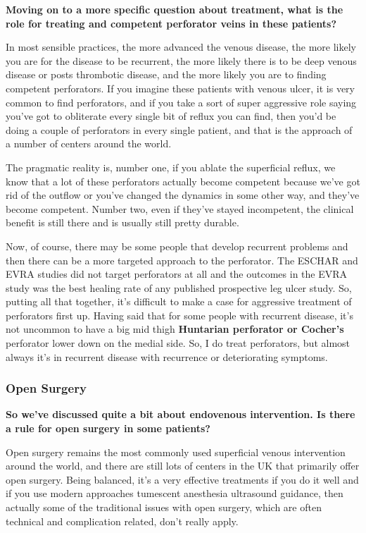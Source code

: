 \documentclass[
]{book}
\begin{document}
\textbf{Moving on to a more specific question about treatment, what is the
role for treating and competent perforator veins in these patients?}

In most sensible practices, the more advanced the venous disease, the
more likely you are for the disease to be recurrent, the more likely
there is to be deep venous disease or posts thrombotic disease, and the
more likely you are to finding competent perforators. If you imagine
these patients with venous ulcer, it is very common to find perforators,
and if you take a sort of super aggressive role saying you've got to
obliterate every single bit of reflux you can find, then you'd be doing
a couple of perforators in every single patient, and that is the
approach of a number of centers around the world.

The pragmatic reality is, number one, if you ablate the superficial
reflux, we know that a lot of these perforators actually become
competent because we've got rid of the outflow or you've changed the
dynamics in some other way, and they've become competent. Number two,
even if they've stayed incompetent, the clinical benefit is still there
and is usually still pretty durable.

Now, of course, there may be some people that develop recurrent problems
and then there can be a more targeted approach to the perforator. The
ESCHAR and EVRA studies did not target perforators at all and the
outcomes in the EVRA study was the best healing rate of any published
prospective leg ulcer study. So, putting all that together, it's
difficult to make a case for aggressive treatment of perforators first
up. Having said that for some people with recurrent disease, it's not
uncommon to have a big mid thigh \textbf{Huntarian perforator or Cocher's}
perforator lower down on the medial side. So, I do treat perforators,
but almost always it's in recurrent disease with recurrence or
deteriorating symptoms.

\hypertarget{open-surgery-1}{%
\subsubsection{Open Surgery}\label{open-surgery-1}}

\textbf{So we've discussed quite a bit about endovenous intervention. Is there
a rule for open surgery in some patients?}

Open surgery remains the most commonly used superficial venous
intervention around the world, and there are still lots of centers in
the UK that primarily offer open surgery. Being balanced, it's a very
effective treatments if you do it well and if you use modern approaches
tumescent anesthesia ultrasound guidance, then actually some of the
traditional issues with open surgery, which are often technical and
complication related, don't really apply.
\end{document}
